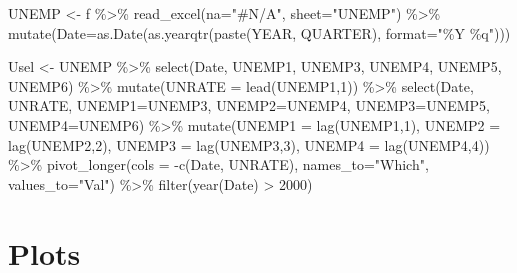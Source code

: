 \documentclass[
  letterpaper,
]{book}
\newenvironment{Shaded}{\begin{snugshade}}{\end{snugshade}}
\newcommand{\AttributeTok}[1]{\textcolor[rgb]{0.40,0.45,0.13}{#1}}
\newcommand{\DecValTok}[1]{\textcolor[rgb]{0.68,0.00,0.00}{#1}}
\newcommand{\FunctionTok}[1]{\textcolor[rgb]{0.28,0.35,0.67}{#1}}
\newcommand{\NormalTok}[1]{\textcolor[rgb]{0.00,0.23,0.31}{#1}}
\newcommand{\OtherTok}[1]{\textcolor[rgb]{0.00,0.23,0.31}{#1}}
\newcommand{\SpecialCharTok}[1]{\textcolor[rgb]{0.37,0.37,0.37}{#1}}
\newcommand{\StringTok}[1]{\textcolor[rgb]{0.13,0.47,0.30}{#1}}
\begin{document}
\begin{Shaded}
\begin{Highlighting}[]
\NormalTok{UNEMP }\OtherTok{\textless{}{-}}\NormalTok{ f }\SpecialCharTok{\%\textgreater{}\%}
  \FunctionTok{read\_excel}\NormalTok{(}\AttributeTok{na=}\StringTok{"\#N/A"}\NormalTok{, }\AttributeTok{sheet=}\StringTok{"UNEMP"}\NormalTok{) }\SpecialCharTok{\%\textgreater{}\%} 
  \FunctionTok{mutate}\NormalTok{(}\AttributeTok{Date=}\FunctionTok{as.Date}\NormalTok{(}\FunctionTok{as.yearqtr}\NormalTok{(}\FunctionTok{paste}\NormalTok{(YEAR, QUARTER), }\AttributeTok{format=}\StringTok{"\%Y \%q"}\NormalTok{))) }

\NormalTok{Usel }\OtherTok{\textless{}{-}}\NormalTok{ UNEMP }\SpecialCharTok{\%\textgreater{}\%} 
  \FunctionTok{select}\NormalTok{(Date, UNEMP1, UNEMP3, UNEMP4, UNEMP5, UNEMP6) }\SpecialCharTok{\%\textgreater{}\%}
  \FunctionTok{mutate}\NormalTok{(}\AttributeTok{UNRATE =} \FunctionTok{lead}\NormalTok{(UNEMP1,}\DecValTok{1}\NormalTok{)) }\SpecialCharTok{\%\textgreater{}\%}
  \FunctionTok{select}\NormalTok{(Date, UNRATE, }
         \AttributeTok{UNEMP1=}\NormalTok{UNEMP3, }\AttributeTok{UNEMP2=}\NormalTok{UNEMP4, }\AttributeTok{UNEMP3=}\NormalTok{UNEMP5, }\AttributeTok{UNEMP4=}\NormalTok{UNEMP6) }\SpecialCharTok{\%\textgreater{}\%}
  \FunctionTok{mutate}\NormalTok{(}\AttributeTok{UNEMP1 =} \FunctionTok{lag}\NormalTok{(UNEMP1,}\DecValTok{1}\NormalTok{), }
         \AttributeTok{UNEMP2 =} \FunctionTok{lag}\NormalTok{(UNEMP2,}\DecValTok{2}\NormalTok{), }
         \AttributeTok{UNEMP3 =} \FunctionTok{lag}\NormalTok{(UNEMP3,}\DecValTok{3}\NormalTok{), }
         \AttributeTok{UNEMP4 =} \FunctionTok{lag}\NormalTok{(UNEMP4,}\DecValTok{4}\NormalTok{)) }\SpecialCharTok{\%\textgreater{}\%}
  \FunctionTok{pivot\_longer}\NormalTok{(}\AttributeTok{cols =} \SpecialCharTok{{-}}\FunctionTok{c}\NormalTok{(Date, UNRATE), }\AttributeTok{names\_to=}\StringTok{"Which"}\NormalTok{, }\AttributeTok{values\_to=}\StringTok{"Val"}\NormalTok{) }\SpecialCharTok{\%\textgreater{}\%}
  \FunctionTok{filter}\NormalTok{(}\FunctionTok{year}\NormalTok{(Date) }\SpecialCharTok{\textgreater{}} \DecValTok{2000}\NormalTok{)}
\end{Highlighting}
\end{Shaded}

\hypertarget{plots}{%
\section{Plots}\label{plots}}
\end{document}
